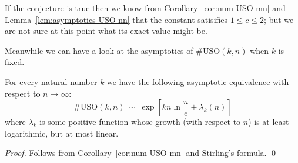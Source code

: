 \documentclass[runningheads,a4paper]{llncs}
\newcommand{\USO}{\ensuremath{\mathrm{USO}}}
\begin{document}
\noindent
If the conjecture is true then we know from Corollary~\ref{cor:num-USO-mn} and
Lemma~\ref{lem:asymptotics-USO-nn} that the constant satisifies $1 \le c \le
2$; but we are not sure at this point what its exact value might be.

Meanwhile we can have a look at the asymptotics of $\#\USO(k,n)$ when $k$ is
fixed.

\begin{proposition}
    \label{prop:asymptotics-USO-kn}
    For every natural number $k$ we have the following asymptotic
    equivalence with respect to $n \to \infty$:
    \[
        \#\USO(k,n) ~\sim~ \exp\left[
            k n \ln \frac{n}{e} + \lambda_k(n)
        \right]
    \]
    where $\lambda_k$ is some positive function whose growth (with respect to
    $n$) is at least logarithmic, but at most linear.
\end{proposition}

\begin{proof}
    Follows from Corollary~\ref{cor:num-USO-mn} and Stirling's formula. \qed
\end{proof}



\end{document}
